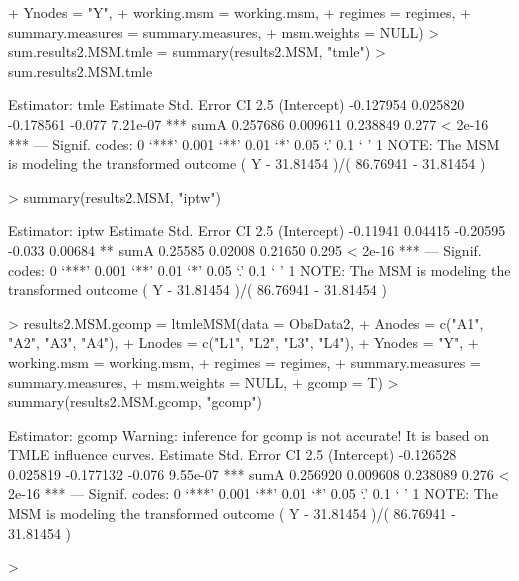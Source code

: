 \documentclass[answers]{exam}
\begin{document}
\begin{solution}
\begin{Schunk}
\begin{Sinput}
+                         Ynodes = "Y", 
+                         working.msm = working.msm, 
+                         regimes = regimes, 
+                         summary.measures = summary.measures, 
+                         msm.weights = NULL)
> sum.results2.MSM.tmle = summary(results2.MSM, "tmle")
> sum.results2.MSM.tmle
\end{Sinput}
\begin{Soutput}
Estimator:  tmle 
             Estimate Std. Error   CI 2.5%
(Intercept) -0.127954   0.025820 -0.178561   -0.077 7.21e-07 ***
sumA         0.257686   0.009611  0.238849    0.277  < 2e-16 ***
---
Signif. codes:  0 ‘***’ 0.001 ‘**’ 0.01 ‘*’ 0.05 ‘.’ 0.1 ‘ ’ 1
NOTE: The MSM is modeling the transformed outcome ( Y - 31.81454 )/( 86.76941 - 31.81454 )
\end{Soutput}
\begin{Sinput}
> summary(results2.MSM, "iptw")
\end{Sinput}
\begin{Soutput}
Estimator:  iptw 
            Estimate Std. Error  CI 2.5%
(Intercept) -0.11941    0.04415 -0.20595   -0.033 0.00684 ** 
sumA         0.25585    0.02008  0.21650    0.295 < 2e-16 ***
---
Signif. codes:  0 ‘***’ 0.001 ‘**’ 0.01 ‘*’ 0.05 ‘.’ 0.1 ‘ ’ 1
NOTE: The MSM is modeling the transformed outcome ( Y - 31.81454 )/( 86.76941 - 31.81454 )
\end{Soutput}
\begin{Sinput}
> results2.MSM.gcomp = ltmleMSM(data = ObsData2, 
+                               Anodes = c("A1", "A2", "A3", "A4"), 
+                               Lnodes = c("L1", "L2", "L3", "L4"), 
+                               Ynodes = "Y", 
+                               working.msm = working.msm, 
+                               regimes = regimes, 
+                               summary.measures = summary.measures, 
+                               msm.weights = NULL,
+                               gcomp = T)
> summary(results2.MSM.gcomp, "gcomp")
\end{Sinput}
\begin{Soutput}
Estimator:  gcomp 
Warning: inference for gcomp is not accurate! It is based on TMLE influence curves.
             Estimate Std. Error   CI 2.5%
(Intercept) -0.126528   0.025819 -0.177132   -0.076 9.55e-07 ***
sumA         0.256920   0.009608  0.238089    0.276  < 2e-16 ***
---
Signif. codes:  0 ‘***’ 0.001 ‘**’ 0.01 ‘*’ 0.05 ‘.’ 0.1 ‘ ’ 1
NOTE: The MSM is modeling the transformed outcome ( Y - 31.81454 )/( 86.76941 - 31.81454 )
\end{Soutput}
\begin{Sinput}
> 
\end{Sinput}
\end{Schunk}


\end{solution}
\end{document}
